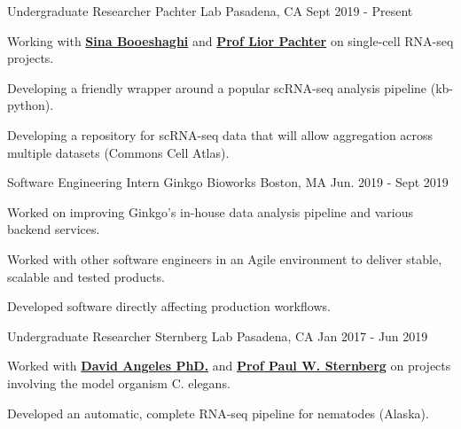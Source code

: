 

\begin{cventries}

\cventry
  {Undergraduate Researcher} %
  {Pachter Lab} %
  {Pasadena, CA} %
  {Sept 2019 - Present} %
  {
    \begin{cvitems} %
      \item {Working with \textbf{\href{https://sinabooeshaghi.com/}{Sina Booeshaghi}} and \textbf{\href{https://pachterlab.github.io/biography.html}{Prof Lior Pachter}} on single-cell RNA-seq projects.}
      \item {Developing a friendly wrapper around a popular scRNA-seq analysis pipeline (kb-python).}
      \item {Developing a repository for scRNA-seq data that will allow aggregation across multiple datasets (Commons Cell Atlas).}
    \end{cvitems}
  }

  \cventry
    {Software Engineering Intern} %
    {Ginkgo Bioworks} %
    {Boston, MA} %
    {Jun. 2019 - Sept 2019} %
    {
      \begin{cvitems} %
        \item {Worked on improving Ginkgo's in-house data analysis pipeline and various backend services.}
        \item {Worked with other software engineers in an Agile environment to deliver stable, scalable and tested products.}
        \item {Developed software directly affecting production workflows.}
      \end{cvitems}
    }

\cventry
  {Undergraduate Researcher} %
  {Sternberg Lab} %
  {Pasadena, CA} %
  {Jan 2017 - Jun 2019} %
  {
    \begin{cvitems} %
      \item {Worked with \textbf{\href{https://dangeles.github.io/}{David Angeles PhD.}} and \textbf{\href{http://wormlab.caltech.edu/LabMembers/Paul}{Prof Paul W. Sternberg}} on projects involving the model organism C. elegans.}
      \item {Developed an automatic, complete RNA-seq pipeline for nematodes (Alaska).}
    \end{cvitems}
  }

\end{cventries}
